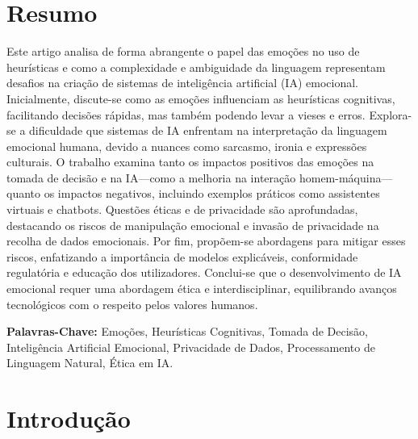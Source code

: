 \documentclass[a4paper,12pt]{report}
\begin{document}
	
	\newpage
	\thispagestyle{empty}
	\mbox{}
	\newpage
	
	
	\section*{Resumo}
	
	Este artigo analisa de forma abrangente o papel das emoções no uso de heurísticas e como a complexidade e ambiguidade da linguagem representam desafios na criação de sistemas de inteligência artificial (IA) emocional. Inicialmente, discute-se como as emoções influenciam as heurísticas cognitivas, facilitando decisões rápidas, mas também podendo levar a vieses e erros. Explora-se a dificuldade que sistemas de IA enfrentam na interpretação da linguagem emocional humana, devido a nuances como sarcasmo, ironia e expressões culturais. O trabalho examina tanto os impactos positivos das emoções na tomada de decisão e na IA—como a melhoria na interação homem-máquina—quanto os impactos negativos, incluindo exemplos práticos como assistentes virtuais e chatbots. Questões éticas e de privacidade são aprofundadas, destacando os riscos de manipulação emocional e invasão de privacidade na recolha de dados emocionais. Por fim, propõem-se abordagens para mitigar esses riscos, enfatizando a importância de modelos explicáveis, conformidade regulatória e educação dos utilizadores. Conclui-se que o desenvolvimento de IA emocional requer uma abordagem ética e interdisciplinar, equilibrando avanços tecnológicos com o respeito pelos valores humanos.
	
	\vspace{4em}
	
	\noindent\textbf{Palavras-Chave:} \normalsize{Emoções, Heurísticas Cognitivas, Tomada de Decisão, Inteligência Artificial Emocional, Privacidade de Dados, Processamento de Linguagem Natural, Ética em IA.}
	
	\newpage	
	
	
	\section{Introdução}
	
\end{document}
